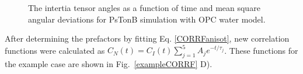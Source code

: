 \documentclass[pre,aps,floatfix,authordate1-4,twocolumn]{revtex4-1}
\begin{document}
\begin{figure}[!h]
  \caption{The intertia tensor angles as a function of time and mean square angular
    deviations for PsTonB simulation with OPC water model.
    \label{RMASDplot}}%
\end{figure}

After determining the prefactors by fitting Eq. \ref{CORRFanisot}, new correlation functions
were calculated as $C_N(t)=C_I(t)\sum_{j=1}^5 A_j e^{-t/\tau_j}$. These functions for the example
case are shown in Fig.~\ref{exampleCORRF} D).

\end{document}
